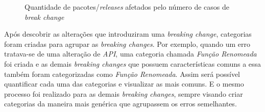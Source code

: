 \begin {figure} [h!]
{        
    }
    \caption{Quantidade de pacotes/\textit{releases} afetados pelo número de casos de \textit{break change}}
    \label{fig:result_rq1_once_twice_three}
\end{figure}

Após descobrir as alterações que introduziram uma \textit{breaking change}, categorias foram criadas para agrupar as \textit{breaking changes}. Por exemplo, quando um erro tratava-se de uma alteração de \textit{API}, uma categoria chamada \textit{Função Renomeada} foi criada e as demais \textit{breaking changes} que possuem características comuns a essa também foram categorizadas como \textit{Função Renomeada}. Assim será possível quantificar cada uma das categorias e visualizar as mais comuns. E o mesmo processo foi realizado para as demais \textit{breaking changes}, sempre visando criar categorias da maneira mais genérica que agrupassem os erros semelhantes.

